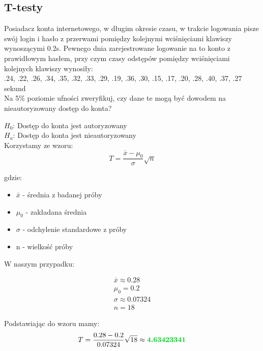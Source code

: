 \documentclass[12pt]{article}
\begin{document}
    \subsection{T-testy}
    \begin{exercise}
        Posiadacz konta internetowego, w długim okresie czasu, w trakcie logowania pisze swój login i hasło z przerwami pomiędzy kolejnymi wciśnięciami klawiszy wynoszącymi 0.2s. Pewnego dnia zarejestrowane logowanie na to konto z prawidłowym hasłem, przy czym czasy odstępów pomiędzy wciśnięciami kolejnych klawiszy wynosiły: \\

        .24, .22, .26, .34, .35, .32, .33, .29, .19, .36, .30, .15, .17, .20, .28, .40, .37, .27 sekund \\

        Na 5\% poziomie ufności zweryfikuj, czy dane te mogą być dowodem na nieautoryzowany dostęp do konta?
    \end{exercise}

    $H_{0}$: Dostęp do konta jest autoryzowany \\

    $H_{a}$: Dostęp do konta jest nieautoryzowany \\

    Korzystamy ze wzoru:
    \begin{equation*}
        T = \frac{\bar{x} - \mu_{0}}{\sigma}\sqrt{n}
    \end{equation*}

    gdzie:
    \begin{itemize}
        \item $\bar{x}$ - średnia z badanej próby
        \item $\mu_{0}$ - zakładana średnia
        \item $\sigma$ - odchylenie standardowe z próby
        \item n - wielkość próby
    \end{itemize}

    W naszym przypadku:

    \begin{gather}
        \bar{x} \approx 0.28 \\
        \mu_{0} = 0.2 \\
        \sigma \approx 0.07324 \\
        n = 18
    \end{gather}

    Podstawiając do wzoru mamy:
    \begin{equation*}
        T = \frac{0.28 - 0.2}{0.07324}\sqrt{18} \approx \textbf{\color[HTML]{00ca1f}4.63423341}
    \end{equation*}
\end{document}
